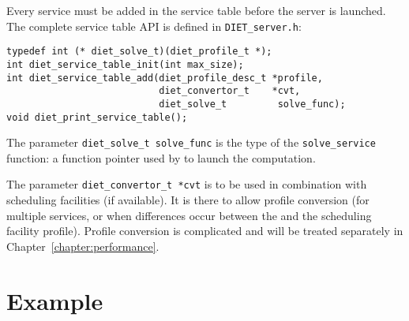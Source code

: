 Every service must be added in the service table before the server is
launched. The complete service table API is defined in \texttt{DIET\_server.h}:
{\footnotesize
\begin{verbatim}
typedef int (* diet_solve_t)(diet_profile_t *);
int diet_service_table_init(int max_size);
int diet_service_table_add(diet_profile_desc_t *profile,
                           diet_convertor_t    *cvt,
                           diet_solve_t         solve_func);
void diet_print_service_table();
\end{verbatim}
}

The parameter \texttt{diet\_solve\_t solve\_func} is the type of the
\texttt{solve\_service} function: a function pointer used by \diet to launch the
computation.

The parameter \texttt{diet\_convertor\_t *cvt} is to be used in combination
with scheduling facilities (if available). It is there to allow profile conversion (for
multiple services, or when differences occur between the \diet and the scheduling facility
profile). Profile conversion is complicated and will be treated
separately in Chapter~\ref{chapter:performance}.

\section{Example}
\label{sec:sv_ex}

